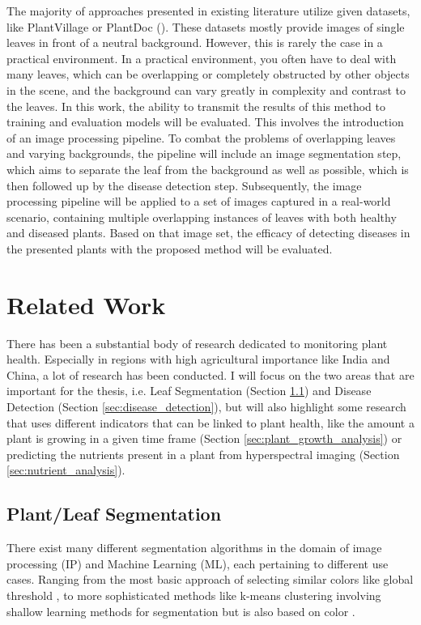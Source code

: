 \documentclass[draft,final]{vutinfth} %
\begin{document}
The majority of approaches presented in existing literature utilize given datasets, like PlantVillage or PlantDoc (\cite{hughes_open_2016, singh_plantdoc_2020}). These datasets mostly provide images of single leaves in front of a neutral background. However, this is rarely the case in a practical environment. 
In a practical environment, you often have to deal with many leaves, which can be overlapping or completely obstructed by other objects in the scene, and the background can vary greatly in complexity and contrast to the leaves. 
In this work, the ability to transmit the results of this method to training and evaluation models will be evaluated. This involves the introduction of an image processing pipeline. To combat the problems of overlapping leaves and varying backgrounds, the pipeline will include an image segmentation step, which aims to separate the leaf from the background as well as possible, which is then followed up by the disease detection step. 
Subsequently, the image processing pipeline will be applied to a set of images captured in a real-world scenario, containing multiple overlapping instances of leaves with both healthy and diseased plants. Based on that image set, the efficacy of detecting diseases in the presented plants with the proposed method will be evaluated.

\chapter{Related Work}
There has been a substantial body of research dedicated to monitoring plant health. Especially in regions with high agricultural importance like India and China, a lot of research has been conducted. I will focus on the two areas that are important for the thesis, i.e. Leaf Segmentation (Section \ref{sec:leaf_seg}) and Disease Detection (Section \ref{sec:disease_detection}), but will also highlight some research that uses different indicators that can be linked to plant health, like the amount a plant is growing in a given time frame (Section \ref{sec:plant_growth_analysis}) or predicting the nutrients present in a plant from hyperspectral imaging (Section \ref{sec:nutrient_analysis}).

\section{Plant/Leaf Segmentation} \label{sec:leaf_seg}

There exist many different segmentation algorithms in the domain of image processing (IP) and Machine Learning (ML), each pertaining to different use cases. Ranging from the most basic approach of selecting similar colors like global threshold \cite{lu_chapter_2024}, to more sophisticated methods like k-means clustering involving shallow learning methods for segmentation but is also based on color \cite{dhanachandra_image_2015}.
\end{document}
